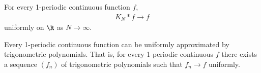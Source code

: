 \documentclass{article}
\begin{document}
\begin{theorem}[Fej\'er]
    For every 1-periodic continuous function $f$,
    \begin{align*}
        K_N*f\to f
    \end{align*}
    uniformly on $\R$ as $N\to \infty$.
\end{theorem}

\begin{corollary*}
    Every 1-periodic continuous function can be uniformly approximated by trigonometric
    polynomials. That is, for every 1-periodic continuous $f$ there exists a sequence
    $(f_n)$ of trigonometric polynomials such that $f_n\to f$ uniformly.
\end{corollary*}
\end{document}
